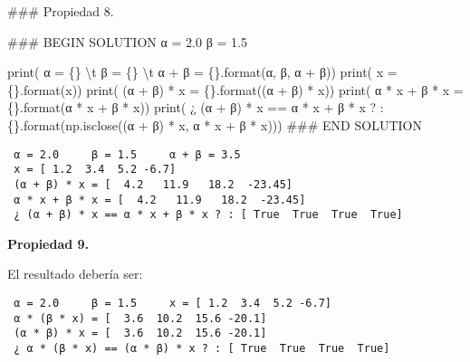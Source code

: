 \documentclass[
  letterpaper,
  DIV=11,
  numbers=noendperiod]{scrreprt}
\newenvironment{Shaded}{\begin{snugshade}}{\end{snugshade}}
\newcommand{\BuiltInTok}[1]{\textcolor[rgb]{0.00,0.23,0.31}{#1}}
\newcommand{\CharTok}[1]{\textcolor[rgb]{0.13,0.47,0.30}{#1}}
\newcommand{\CommentTok}[1]{\textcolor[rgb]{0.37,0.37,0.37}{#1}}
\newcommand{\FloatTok}[1]{\textcolor[rgb]{0.68,0.00,0.00}{#1}}
\newcommand{\NormalTok}[1]{\textcolor[rgb]{0.00,0.23,0.31}{#1}}
\newcommand{\OperatorTok}[1]{\textcolor[rgb]{0.37,0.37,0.37}{#1}}
\newcommand{\RegionMarkerTok}[1]{\textcolor[rgb]{0.00,0.23,0.31}{#1}}
\newcommand{\SpecialCharTok}[1]{\textcolor[rgb]{0.37,0.37,0.37}{#1}}
\newcommand{\StringTok}[1]{\textcolor[rgb]{0.13,0.47,0.30}{#1}}
\begin{document}
\begin{Shaded}
\begin{Highlighting}[]
\CommentTok{\#\#\# Propiedad 8.}

\CommentTok{\#\#\# }\RegionMarkerTok{BEGIN}\CommentTok{ SOLUTION}
\NormalTok{α }\OperatorTok{=} \FloatTok{2.0}
\NormalTok{β }\OperatorTok{=} \FloatTok{1.5}

\BuiltInTok{print}\NormalTok{(}\StringTok{\textquotesingle{} α = }\SpecialCharTok{\{\}}\StringTok{ }\CharTok{\textbackslash{}t}\StringTok{ β = }\SpecialCharTok{\{\}}\StringTok{ }\CharTok{\textbackslash{}t}\StringTok{ α + β = }\SpecialCharTok{\{\}}\StringTok{\textquotesingle{}}\NormalTok{.}\BuiltInTok{format}\NormalTok{(α, β, α }\OperatorTok{+}\NormalTok{ β))}
\BuiltInTok{print}\NormalTok{(}\StringTok{\textquotesingle{} x = }\SpecialCharTok{\{\}}\StringTok{\textquotesingle{}}\NormalTok{.}\BuiltInTok{format}\NormalTok{(x))}
\BuiltInTok{print}\NormalTok{(}\StringTok{\textquotesingle{} (α + β) * x = }\SpecialCharTok{\{\}}\StringTok{\textquotesingle{}}\NormalTok{.}\BuiltInTok{format}\NormalTok{((α }\OperatorTok{+}\NormalTok{ β) }\OperatorTok{*}\NormalTok{ x))}
\BuiltInTok{print}\NormalTok{(}\StringTok{\textquotesingle{} α * x + β * x = }\SpecialCharTok{\{\}}\StringTok{\textquotesingle{}}\NormalTok{.}\BuiltInTok{format}\NormalTok{(α }\OperatorTok{*}\NormalTok{ x }\OperatorTok{+}\NormalTok{ β }\OperatorTok{*}\NormalTok{ x))}
\BuiltInTok{print}\NormalTok{(}\StringTok{\textquotesingle{} ¿ (α + β) * x == α * x + β * x ? : }\SpecialCharTok{\{\}}\StringTok{\textquotesingle{}}\NormalTok{.}\BuiltInTok{format}\NormalTok{(np.isclose((α }\OperatorTok{+}\NormalTok{ β) }\OperatorTok{*}\NormalTok{ x, α }\OperatorTok{*}\NormalTok{ x }\OperatorTok{+}\NormalTok{ β }\OperatorTok{*}\NormalTok{ x)))}
\CommentTok{\#\#\# }\RegionMarkerTok{END}\CommentTok{ SOLUTION}
\end{Highlighting}
\end{Shaded}

\begin{verbatim}
 α = 2.0     β = 1.5     α + β = 3.5
 x = [ 1.2  3.4  5.2 -6.7]
 (α + β) * x = [  4.2   11.9   18.2  -23.45]
 α * x + β * x = [  4.2   11.9   18.2  -23.45]
 ¿ (α + β) * x == α * x + β * x ? : [ True  True  True  True]
\end{verbatim}

\textbf{Propiedad 9.}

El resultado debería ser:

\begin{verbatim}
 α = 2.0     β = 1.5     x = [ 1.2  3.4  5.2 -6.7]
 α * (β * x) = [  3.6  10.2  15.6 -20.1]
 (α * β) * x = [  3.6  10.2  15.6 -20.1]
 ¿ α * (β * x) == (α * β) * x ? : [ True  True  True  True]
\end{verbatim}
\end{document}
